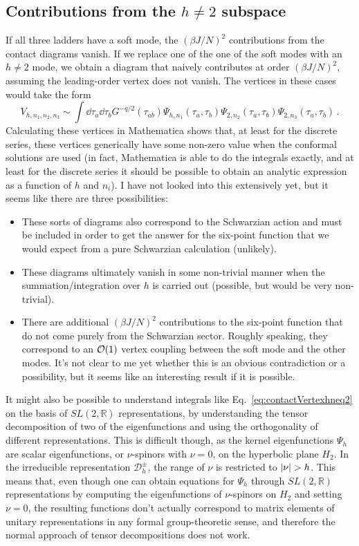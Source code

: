 \documentclass[aps,prx,preprint,onecolumn,citeautoscript,footinbib]{revtex4-1}
\begin{document}
\subsection{Contributions from the $h \neq 2$ subspace}
If all three ladders have a soft mode, the $(\beta J/N)^2$ contributions from the contact diagrams vanish. If we replace one of the one of the soft modes with an $h \neq 2$ mode, we obtain a diagram that naively contributes at order $(\beta J/N)^2$, assuming the leading-order vertex does not vanish. The vertices in these cases would take the form
\begin{equation}
    V_{h, n_1, n_2, n_3} \sim \int \dd{\tau_a} \dd{\tau_b} G^{-q/2}(\tau_{ab}) \Psi_{h, n_1}(\tau_a, \tau_b) \Psi_{2, n_2}(\tau_a, \tau_b) \Psi_{2, n_3}(\tau_a, \tau_b)\,.
    \label{eq:contactVertexhneq2}
\end{equation}
Calculating these vertices in Mathematica shows that, at least for the discrete series, these vertices generically have some non-zero value when the conformal solutions are used (in fact, Mathematica is able to do the integrals exactly, and at least for the discrete series it should be possible to obtain an analytic expression as a function of $h$ and $n_i$). I have not looked into this extensively yet, but it seems like there are three possibilities:
\begin{itemize}
    \item These sorts of diagrams also correspond to the Schwarzian action and must be included in order to get the answer for the six-point function that we would expect from a pure Schwarzian calculation (unlikely).
    \item These diagrams ultimately vanish in some non-trivial manner when the summation/integration over $h$ is carried out (possible, but would be very non-trivial).
    \item There are additional $(\beta J/N)^2$ contributions to the six-point function that do not come purely from the Schwarzian sector. Roughly speaking, they correspond to an $\order{1}$ vertex coupling between the soft mode and the other modes. It's not clear to me yet whether this is an obvious contradiction or a possibility, but it seems like an interesting result if it is possible.
\end{itemize}
It might also be possible to understand integrals like Eq.~\ref{eq:contactVertexhneq2} on the basis of $SL(2, \mathbb{R})$ representations, by understanding the tensor decomposition of two of the eigenfunctions and using the orthogonality of different representations. This is difficult though, as the kernel eigenfunctions $\Psi_h$ are scalar eigenfunctions, or $\nu$-spinors with $\nu=0$, on the hyperbolic plane $H_2$. In the irreducible representation $\mathcal{D}^\pm_h$, the range of $\nu$ is restricted to $\abs{\nu} > h$. This means that, even though one can obtain equations for $\Psi_h$ through $SL(2, \mathbb{R})$ representations by computing the eigenfunctions of $\nu$-spinors on $H_2$ and setting $\nu=0$, the resulting functions don't actually correspond to matrix elements of unitary representations in any formal group-theoretic sense, and therefore the normal approach of tensor decompositions does not work.
\end{document}
